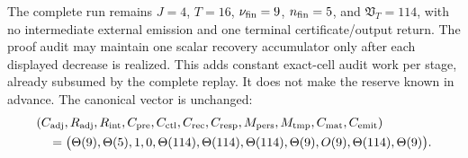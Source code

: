 \begin{proposition}
The complete run remains $J=4$, $T=16$, $\nu_{\rm fin}=9$,
$n_{\rm fin}=5$, and $\mathfrak V_T=114$, with no intermediate external
emission and one terminal certificate/output return.  The proof audit may
maintain one scalar recovery accumulator only after each displayed decrease is
realized.  This adds constant exact-cell audit work per stage, already
subsumed by the complete replay.  It
does not make the reserve known in advance.  The canonical vector is unchanged:
\begin{equation}
 \begin{aligned}
 &(C_{\rm adj},R_{\rm adj},R_{\rm int},C_{\rm pre},C_{\rm ctl},C_{\rm rec},
 C_{\rm resp},M_{\rm pers},M_{\rm tmp},C_{\rm mat},C_{\rm emit})\\
 &\quad=\bigl(\Theta(9),\Theta(5),1,0,
       \Theta(114),\Theta(114),\Theta(114),
       \Theta(9),O(9),\Theta(114),\Theta(9)\bigr).
 \end{aligned}
 \label{eq:path-tight-pair-recovery-eleven-vector}
\end{equation}
\end{proposition}

